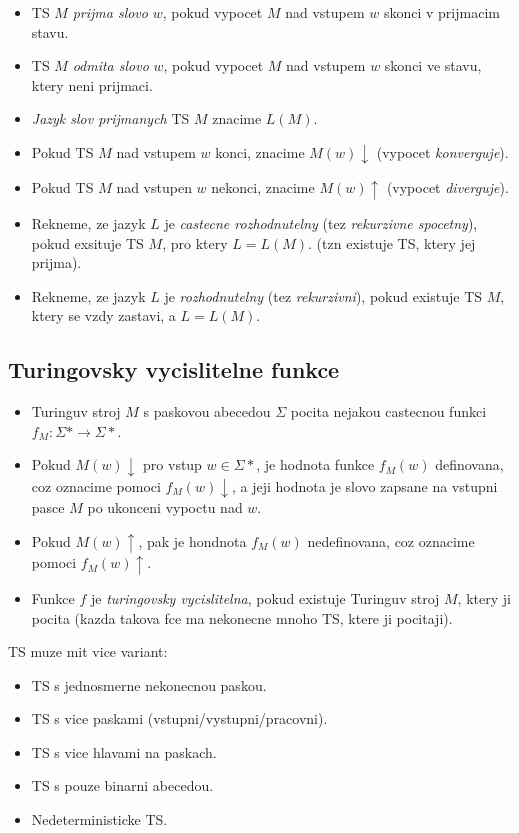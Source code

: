 \documentclass{article}
\theoremstyle{plain}
\theoremstyle{plain}
\theoremstyle{remark}
\begin{document}
\begin{itemize}
    \item TS $M$ \emph{prijma slovo} $w$, pokud vypocet $M$ nad vstupem $w$ skonci v prijmacim stavu.
    \item TS $M$ \emph{odmita slovo} $w$, pokud vypocet $M$ nad vstupem $w$ skonci ve stavu, ktery neni prijmaci.
    \item \emph{Jazyk slov prijmanych} TS $M$ znacime $L(M)$.
    \item Pokud TS $M$ nad vstupem $w$ konci, znacime $M(w)\downarrow$ (vypocet \emph{konverguje}).
    \item Pokud TS $M$ nad vstupen $w$ nekonci, znacime $M(w)\uparrow$ (vypocet \emph{diverguje}).
    \item Rekneme, ze jazyk $L$ je \emph{castecne rozhodnutelny} (tez \emph{rekurzivne spocetny}), pokud exsituje TS $M$, pro ktery $L = L(M)$. (tzn existuje TS, ktery jej prijma).
    \item Rekneme, ze jazyk $L$ je \emph{rozhodnutelny} (tez \emph{rekurzivni}), pokud existuje TS $M$, ktery se vzdy zastavi, a $L = L(M)$.
\end{itemize}

\subsection{Turingovsky vycislitelne funkce}

\begin{itemize}
    \item Turinguv stroj $M$ s paskovou abecedou $\Sigma$ pocita nejakou castecnou funkci $f_M : \Sigma* \rightarrow \Sigma*$.
    \item Pokud $M(w)\downarrow$ pro vstup $w \in \Sigma*$, je hodnota funkce $f_M(w)$ definovana, coz oznacime pomoci $f_M(w)\downarrow$, a jeji hodnota je slovo zapsane na vstupni pasce $M$ po ukonceni vypoctu nad $w$.
    \item Pokud $M(w)\uparrow$, pak je hondnota $f_M(w)$ nedefinovana, coz oznacime pomoci $f_M(w)\uparrow$.
    \item Funkce $f$ je \emph{turingovsky vycislitelna}, pokud existuje Turinguv stroj $M$, ktery ji pocita (kazda takova fce ma nekonecne mnoho TS, ktere ji pocitaji).
\end{itemize}

TS muze mit vice variant:

\begin{itemize}
    \item TS s jednosmerne nekonecnou paskou.
    \item TS s vice paskami (vstupni/vystupni/pracovni).
    \item TS s vice hlavami na paskach.
    \item TS s pouze binarni abecedou.
    \item Nedeterministicke TS.
\end{itemize}
\end{document}

